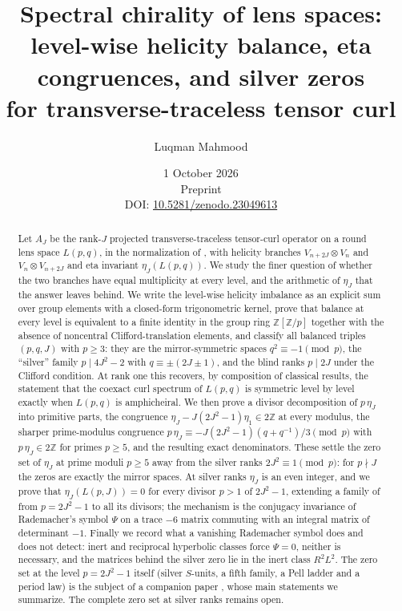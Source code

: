 \documentclass[11pt]{article}
\title{Spectral chirality of lens spaces:\\
level-wise helicity balance, eta congruences, and silver zeros\\
for transverse-traceless tensor curl}
\author{Luqman Mahmood}
\date{1 October 2026\\[3pt]\small Preprint\\
DOI: \href{https://doi.org/10.5281/zenodo.23049613}{10.5281/zenodo.23049613}}
\theoremstyle{definition}
\newcommand{\Z}{\mathbb Z}
\begin{document}
\maketitle

\begin{abstract}
Let $A_J$ be the rank-$J$ projected transverse-traceless tensor-curl
operator on a round lens space $L(p,q)$, in the normalization of
\cite{MahmoodP1Collection2026}, with helicity branches
$V_{n+2J}\otimes V_n$ and $V_n\otimes V_{n+2J}$ and eta invariant
$\eta_J(L(p,q))$.  We study the finer question of whether the two
branches have equal multiplicity at every level, and the arithmetic of
$\eta_J$ that the answer leaves behind.  We write the level-wise helicity
imbalance as an explicit sum over group elements with a closed-form
trigonometric kernel, prove that balance at every level is equivalent to a
finite identity in the group ring $\Z[\Z/p]$ together with the absence of
noncentral Clifford-translation elements, and classify all balanced
triples $(p,q,J)$ with $p\geq3$: they are the mirror-symmetric spaces
$q^2\equiv-1\pmod p$, the ``silver'' family $p\mid4J^2-2$ with
$q\equiv\pm(2J\pm1)$, and the blind ranks $p\mid2J$ under the
Clifford condition.  At rank one this recovers, by composition of
classical results, the statement that the coexact curl spectrum of
$L(p,q)$ is symmetric level by level exactly when $L(p,q)$ is
amphicheiral.  We then prove a divisor decomposition of $p\,\eta_J$ into
primitive parts, the congruence $\eta_J-J(2J^2-1)\eta_1\in2\Z$ at every
modulus, the sharper prime-modulus congruence
$p\,\eta_J\equiv-J(2J^2-1)(q+q^{-1})/3\pmod p$ with $p\,\eta_J\in2\Z$
for primes $p\geq5$, and the resulting exact denominators.  These settle
the zero set of $\eta_J$ at prime moduli $p\geq5$ away from the silver
ranks $2J^2\equiv1\pmod p$: for $p\nmid J$ the zeros are exactly the
mirror spaces.  At silver ranks $\eta_J$ is an even integer, and we prove
that $\eta_J(L(p,J))=0$ for every divisor $p>1$ of $2J^2-1$, extending a
family of \cite{MahmoodP1Collection2026} from $p=2J^2-1$ to all its
divisors; the mechanism is the conjugacy invariance of Rademacher's
symbol $\Psi$ on a trace $-6$ matrix commuting with an integral matrix of
determinant $-1$.  Finally we record what a
vanishing Rademacher symbol does and does not detect: inert and
reciprocal hyperbolic classes force $\Psi=0$, neither is necessary, and
the matrices behind the silver zero lie in the inert class $R^2L^2$.
The zero set at the level $p=2J^2-1$ itself (silver $S$-units, a fifth
family, a Pell ladder and a period law) is the subject of a companion
paper \cite{SilverRankZeros2026}, whose main statements we summarize.
The complete zero set at silver ranks remains open.
\end{abstract}
\end{document}
